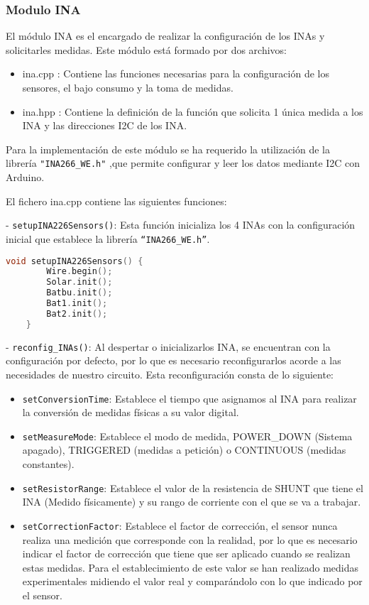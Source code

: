 \subsubsection{Modulo INA}

El módulo INA es el encargado de realizar la configuración de los INAs y solicitarles medidas.
Este módulo está formado por dos archivos:
\begin{itemize}
    \item ina.cpp : Contiene las funciones necesarias para la configuración de los sensores, el bajo consumo y la toma de medidas.
    \item ina.hpp : Contiene la definición de la función que solicita 1 única medida a los INA y las direcciones I2C de los INA.
\end{itemize}

Para la implementación de este módulo se ha requerido la utilización de la librería \texttt{"INA266\_WE.h"} ,que permite configurar y leer los datos mediante I2C con Arduino.\cite{ewaldWollewaldINA226_WE2024}

El fichero ina.cpp contiene las siguientes funciones:

- \texttt{setupINA226Sensors()}: Esta función inicializa los 4 INAs con la configuración inicial que establece la librería \texttt{“INA266\_WE.h”}.

\begin{lstlisting}[captionpos=b, caption={Codigo funcion setupINA226Sensors}, language=c++]
    void setupINA226Sensors() {
        Wire.begin();
        Solar.init();
        Batbu.init();
        Bat1.init();
        Bat2.init();
    }
\end{lstlisting}

- \texttt{reconfig\_INAs()}: Al despertar o inicializarlos INA, se encuentran con la configuración por defecto, por lo que es necesario reconfigurarlos acorde a las necesidades de nuestro circuito. Esta reconfiguración consta de lo siguiente:
\begin{itemize}
    \item \texttt{setConversionTime}: Establece el tiempo que asignamos al INA para realizar la conversión de medidas físicas a su valor digital.
    \item \texttt{setMeasureMode}: Establece el modo de medida, POWER\_DOWN (Sistema apagado), TRIGGERED (medidas a petición) o CONTINUOUS (medidas constantes).
    \item \texttt{setResistorRange}: Establece el valor de la resistencia de SHUNT que tiene el INA (Medido físicamente) y su rango de corriente con el que se va a trabajar.
    \item \texttt{setCorrectionFactor}: Establece el factor de corrección, el sensor nunca realiza una medición que corresponde con la realidad, por lo que es necesario indicar el factor de corrección que tiene que ser aplicado cuando se realizan estas medidas. Para el establecimiento de este valor se han realizado medidas experimentales midiendo el valor real y comparándolo con lo que indicado por el sensor.
\end{itemize}


